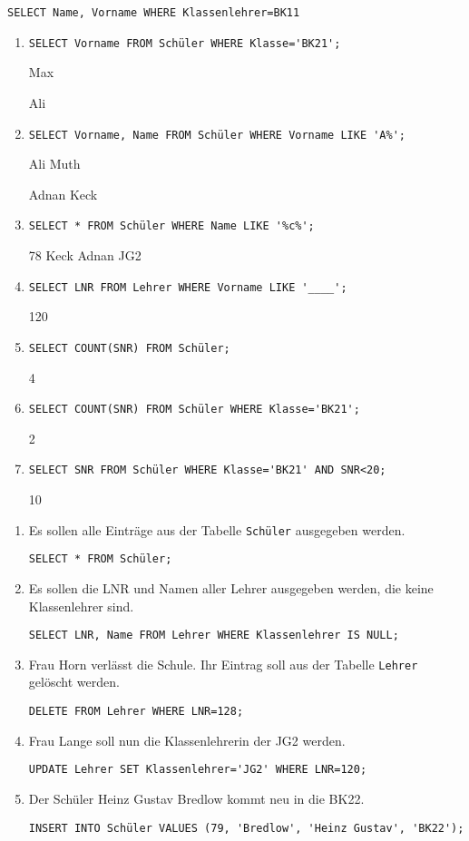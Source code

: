 \documentclass[a4paper,12pt, headsepline, ngerman]{scrartcl}
\begin{document}
    \begin{Exercise}[title={Franz hat versucht einen SQL-Befehl zu erstellen, der Namen und Vornamen des Klassenlehrers der BK11 ausgibt. Finde die 3 Fehler und verbessere sie. (6P)}, label=KA_SQL_A4]

    \lstinline!SELECT Name, Vorname WHERE Klassenlehrer=BK11!
    \end{Exercise}

	\begin{Answer}[ref=KA_SQL_A1]
			\begin{enumerate}[label=\alph*)]
				\item \lstinline!SELECT Vorname FROM Schüler WHERE Klasse='BK21';!

				Max

				Ali
				\item \lstinline!SELECT Vorname, Name FROM Schüler WHERE Vorname LIKE 'A%';!

				Ali Muth

				Adnan Keck
				\item \lstinline!SELECT * FROM Schüler WHERE Name LIKE '%c%';!

				78 Keck Adnan JG2
				\item \lstinline!SELECT LNR FROM Lehrer WHERE Vorname LIKE '____';!

				120
				\item \lstinline!SELECT COUNT(SNR) FROM Schüler;!

				4
				\item \lstinline!SELECT COUNT(SNR) FROM Schüler WHERE Klasse='BK21';!

				2
				\item \lstinline!SELECT SNR FROM Schüler WHERE Klasse='BK21' AND SNR<20;!

				10
			\end{enumerate}
	\end{Answer}%
	\begin{Answer}[ref=KA_SQL_A2]
		\begin{enumerate}[label=\alph*)]
			\item Es sollen alle Einträge aus der Tabelle \lstinline!Schüler! ausgegeben werden.

			\lstinline!SELECT * FROM Schüler;!
			\item Es sollen die LNR und Namen aller Lehrer ausgegeben werden, die keine Klassenlehrer sind.

			\lstinline!SELECT LNR, Name FROM Lehrer WHERE Klassenlehrer IS NULL;!
			\item Frau Horn verlässt die Schule. Ihr Eintrag soll aus der Tabelle \lstinline!Lehrer! gelöscht werden.

			\lstinline!DELETE FROM Lehrer WHERE LNR=128;!
			\item Frau Lange soll nun die Klassenlehrerin der JG2 werden.

			\lstinline!UPDATE Lehrer SET Klassenlehrer='JG2' WHERE LNR=120;!
			\item Der Schüler Heinz Gustav Bredlow kommt neu in die BK22.

			\lstinline!INSERT INTO Schüler VALUES (79, 'Bredlow', 'Heinz Gustav', 'BK22');!
		\end{enumerate}
	\end{Answer}%
\end{document}
